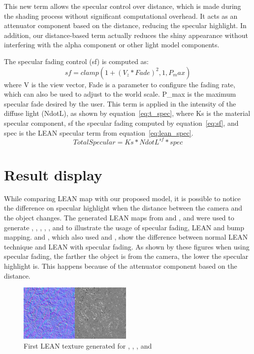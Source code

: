 \documentclass[10pt, conference]{IEEEtran}
\begin{document}
This new term allows the specular control over distance, which is made during the shading process without significant computational overhead. It acts as an attenuator component based on the distance, reducing the specular highlight. In addition, our distance-based term actually reduces the shiny appearance without interfering with the alpha component or other light model components.

The specular fading control (sf) is computed as:
\begin{equation}
\label{eq:sf}
sf = clamp(1 + (V_{z} * Fade)^{2}, 1, P_max)
\end{equation}
where V is the view vector, Fade is a parameter to configure the fading rate, which can also be used to adjust to the world scale. P\_max is the maximum specular fade desired by the user. This term is applied in the intensity of the diffuse light (NdotL), as shown by equation~\ref{eq:t_spec}, where Ks is the material specular component, sf the specular fading computed by equation~\ref{eq:sf}, and spec is the LEAN specular term from equation~\ref{eq:lean_spec}.
\begin{equation}
\label{eq:t_spec}
TotalSpecular = Ks * NdotL^{sf} * spec
\end{equation}

\section{Result display}
\label{sec:results}
%
While comparing LEAN map with our proposed model, it is possible to notice the difference on specular highlight when the distance between the camera and the object changes. The generated LEAN maps from  and ,  and  were used to generate , , , , ,  and  to illustrate the usage of specular fading, LEAN and bump mapping.  and , which also used  and , show the difference between normal LEAN technique and LEAN with specular fading. As shown by these figures when using specular fading, the farther the object is from the camera, the lower the specular highlight is. This happens because of the attenuator component based on the distance.
\begin{figure}[here]
\includegraphics[width=0.49\textwidth]{figs/Lean21.png}
\caption{First LEAN texture generated for , , ,  and }
\label{fig:Lean21}
\end{figure}
\end{document}
